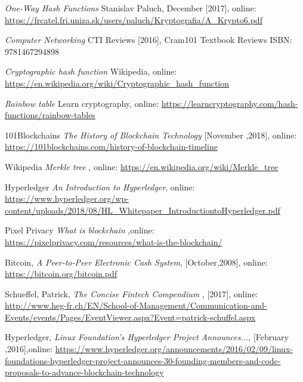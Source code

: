 \begin{thebibliography}{99}                                
\label{literatura}


\textit{One-Way Hash Functions} Stanislav Paluch, December [2017], online: 
\url{https://frcatel.fri.uniza.sk/users/paluch/Kryptografia/A_Krypto6.pdf}

\textit{Computer Networking} CTI Reviews [2016], Cram101 Textbook Reviews ISBN: 9781467294898 

\textit{Cryptographic hash function} Wikipedia, online: 
\url{https://en.wikipedia.org/wiki/Cryptographic_hash_function}

\textit{Rainbow table} Learn cryptography, online: \url{https://learncryptography.com/hash-functions/rainbow-tables}

 101Blockchains 
\textit{The History of Blockchain Technology} [November ,2018], online: 
\url{https://101blockchains.com/history-of-blockchain-timeline}

 Wikipedia
\textit{Merkle tree} , online: 
\url{https://en.wikipedia.org/wiki/Merkle_tree}

 Hyperledger 
\textit{An Introduction to Hyperledger}, online: \url{https://www.hyperledger.org/wp-content/uploads/2018/08/HL_Whitepaper_IntroductiontoHyperledger.pdf}

 Pixel Privacy
\textit{What is blockchain} ,online: 
\url{https://pixelprivacy.com/resources/what-is-the-blockchain/}

 Bitcoin, \textit{ A Peer-to-Peer Electronic Cash System}, [October,2008], online: 
\url{https://bitcoin.org/bitcoin.pdf}

 Schueffel, Patrick, \textit{ The Concise Fintech Compendium }, [2017], online: 
\url{http://www.heg-fr.ch/EN/School-of-Management/Communication-and-Events/events/Pages/EventViewer.aspx?Event=patrick-schuffel.aspx}

 Hyperledger, 
\textit{Linux Foundation’s Hyperledger Project Announces...}, [February ,2016],online: 
\url{https://www.hyperledger.org/announcements/2016/02/09/linux-foundations-hyperledger-project-announces-30-founding-members-and-code-proposals-to-advance-blockchain-technology}


\end{thebibliography}

